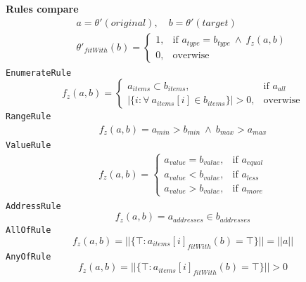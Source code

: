 \documentclass[12pt]{report}
\def\code#1{\colorbox{light-gray}{\texttt{#1}}}
\begin{document}
\textbf{Rules compare}
\begin{equation}
\begin{aligned}
a = \theta'(original), \quad b = \theta'(target) \\
\theta'_{fitWith}(b) = \begin{cases}
	1, & \text{if } a_{type} = b_{type} \ \wedge \ f_z(a, b) \\
	0, & \text{overwise}
\end{cases}
\end{aligned}
\end{equation}
\code{EnumerateRule}
\begin{equation}
f_z(a, b) = \begin{cases}
	a_{items} \subset b_{items}, & \text{if } a_{all} \\
	|\{i: \forall \ a_{items}[i] \in b_{items}\}|> 0, & \text{overwise}
\end{cases}
\end{equation}
\code{RangeRule}
\begin{equation}
\begin{aligned}
f_z(a, b) = a_{min} > b_{min} \ \wedge \ b_{max} > a_{max}
\end{aligned}
\end{equation}
\code{ValueRule}
\begin{equation}
\begin{aligned}
f_z(a, b) = \begin{cases}
	a_{value} = b_{value}, & \text{if } a_{equal} \\
	a_{value} < b_{value}, & \text{if } a_{less} \\
	a_{value} > b_{value}, & \text{if } a_{more}
\end{cases}
\end{aligned}
\end{equation}
\code{AddressRule}
\begin{equation}
f_z(a, b) = a_{addresses} \in b_{addresses}
\end{equation}
\code{AllOfRule}
\begin{equation}
f_z(a, b) = ||\{\top: a_{items}[i]_{fitWith}(b) = \top\}|| = ||a||
\end{equation}
\code{AnyOfRule}
\begin{equation}
f_z(a, b) = ||\{\top: a_{items}[i]_{fitWith}(b) = \top\}|| > 0
\end{equation}
\end{document}
